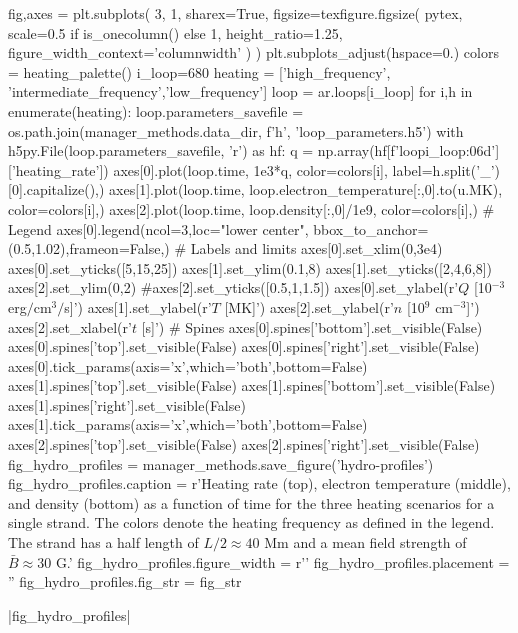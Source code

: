 \begin{pycode}
fig,axes = plt.subplots(
    3, 1, sharex=True,
    figsize=texfigure.figsize(
        pytex,
        scale=0.5 if is_onecolumn() else 1,
        height_ratio=1.25,
        figure_width_context='columnwidth'
    )
)
plt.subplots_adjust(hspace=0.)
colors = heating_palette()
i_loop=680
heating = ['high_frequency', 'intermediate_frequency','low_frequency']
loop = ar.loops[i_loop]
for i,h in enumerate(heating):
    loop.parameters_savefile = os.path.join(manager_methods.data_dir, f'{h}', 'loop_parameters.h5')
    with h5py.File(loop.parameters_savefile, 'r') as hf:
        q = np.array(hf[f'loop{i_loop:06d}']['heating_rate'])
    axes[0].plot(loop.time, 1e3*q, color=colors[i], label=h.split('_')[0].capitalize(),)
    axes[1].plot(loop.time, loop.electron_temperature[:,0].to(u.MK), color=colors[i],)
    axes[2].plot(loop.time, loop.density[:,0]/1e9, color=colors[i],)
# Legend
axes[0].legend(ncol=3,loc="lower center", bbox_to_anchor=(0.5,1.02),frameon=False,)
# Labels and limits
axes[0].set_xlim(0,3e4)
axes[0].set_yticks([5,15,25])
axes[1].set_ylim(0.1,8)
axes[1].set_yticks([2,4,6,8])
axes[2].set_ylim(0,2)
#axes[2].set_yticks([0.5,1,1.5])
axes[0].set_ylabel(r'$Q$ [10$^{-3}$ erg$/$cm$^{3}$$/$s]')
axes[1].set_ylabel(r'$T$ [MK]')
axes[2].set_ylabel(r'$n$ [10$^9$ cm$^{-3}$]')
axes[2].set_xlabel(r'$t$ [s]')
# Spines
axes[0].spines['bottom'].set_visible(False)
axes[0].spines['top'].set_visible(False)
axes[0].spines['right'].set_visible(False)
axes[0].tick_params(axis='x',which='both',bottom=False)
axes[1].spines['top'].set_visible(False)
axes[1].spines['bottom'].set_visible(False)
axes[1].spines['right'].set_visible(False)
axes[1].tick_params(axis='x',which='both',bottom=False)
axes[2].spines['top'].set_visible(False)
axes[2].spines['right'].set_visible(False)
fig_hydro_profiles = manager_methods.save_figure('hydro-profiles')
fig_hydro_profiles.caption = r'Heating rate (top), electron temperature (middle), and density (bottom) as a function of time for the three heating scenarios for a single strand. The colors denote the heating frequency as defined in the legend. The strand has a half length of $L/2\approx40$ Mm and a mean field strength of $\bar{B}\approx30$ G.'
fig_hydro_profiles.figure_width = r'\columnwidth'
fig_hydro_profiles.placement = ''
fig_hydro_profiles.fig_str = fig_str
\end{pycode}
|fig_hydro_profiles|

